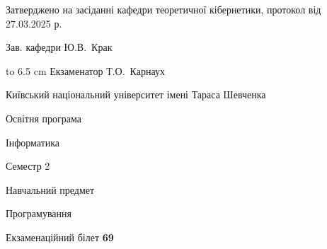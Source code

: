 \documentclass[12pt, ukrainian]{article}
\begin{document}
{\smallskip\smallskip \begin {scriptsize} Затверджено на засіданні кафедри теоретичної кібернетики, протокол   від   27.03.2025 р.\par\smallskip\smallskip\smallskip\smallskip
{\parbox {6.5 cm} {Зав. кафедри \dotfill Ю.В.~Крак}}\hspace {0.7cm} {\hbox to 6.5 cm { Екзаменатор \dotfill Т.О.~Карнаух}} \end{scriptsize}}
\newpage
{{\begin {scriptsize}\par
{ \center  Київський національний університет імені Тараса Шевченка \par}
{\parbox {5 cm}{Освітня програма \hfill}{\parbox {7 cm}{Інформатика\hfill}}\parbox {6 cm}{\hfill Семестр 2}}\par
{\parbox {5 cm} {Навчальний предмет \hfill}\parbox {7 cm}{Програмування \hfill}\parbox {6cm}{\hfill}\par}\vspace{-15pt} \end{scriptsize}}{\center Екзаменаційний білет \No \textbf { 69 }\par}}
\end{document}

